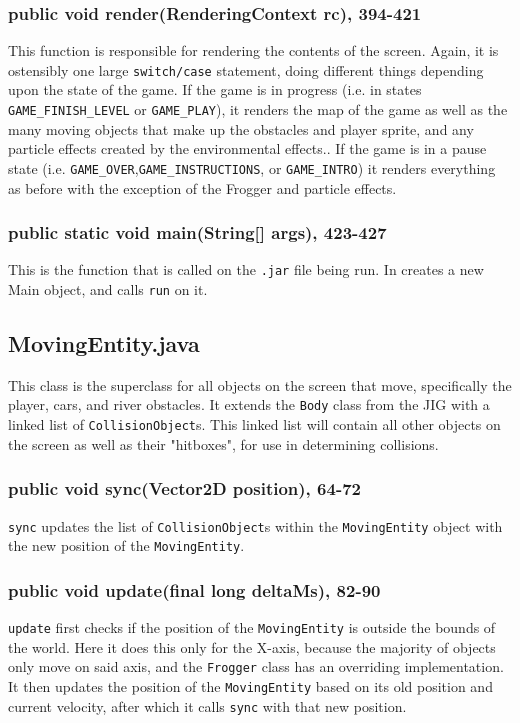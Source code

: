 \documentclass[12pt]{article}
\begin{document}
\subsubsection{public void render(RenderingContext rc), 394-421}
This function is responsible for rendering the contents of the screen.
Again, it is ostensibly one large \verb|switch/case| statement, doing different things depending upon the state of the game.
If the game is in progress (i.e. in states \verb|GAME_FINISH_LEVEL| or \verb|GAME_PLAY|), it renders the map of the game as well as the many moving objects that make up the obstacles and player sprite, and any particle effects created by the environmental effects..
If the game is in a pause state (i.e. \verb|GAME_OVER|,\verb|GAME_INSTRUCTIONS|, or \verb|GAME_INTRO|) it renders everything as before with the exception of the Frogger and particle effects.

\subsubsection{public static void main(String[] args), 423-427}
This is the function that is called on the \verb|.jar| file being run.
In creates a new Main object, and calls \verb|run| on it.

\subsection{MovingEntity.java}
This class is the superclass for all objects on the screen that move, specifically the player, cars, and river obstacles.
It extends the \verb|Body| class from the JIG with a linked list of \verb|CollisionObject|s.
This linked list will contain all other objects on the screen as well as their "hitboxes", for use in determining collisions.

\subsubsection{public void sync(Vector2D position), 64-72}
\verb|sync| updates the list of \verb|CollisionObject|s within the \verb|MovingEntity| object with the new position of the \verb|MovingEntity|.

\subsubsection{public void update(final long deltaMs), 82-90}
\verb|update| first checks if the position of the \verb|MovingEntity| is outside the bounds of the world.
Here it does this only for the X-axis, because the majority of objects only move on said axis, and the \verb|Frogger| class has an overriding implementation.
It then updates the position of the \verb|MovingEntity| based on its old position and current velocity, after which it calls \verb|sync| with that new position.
\end{document}
